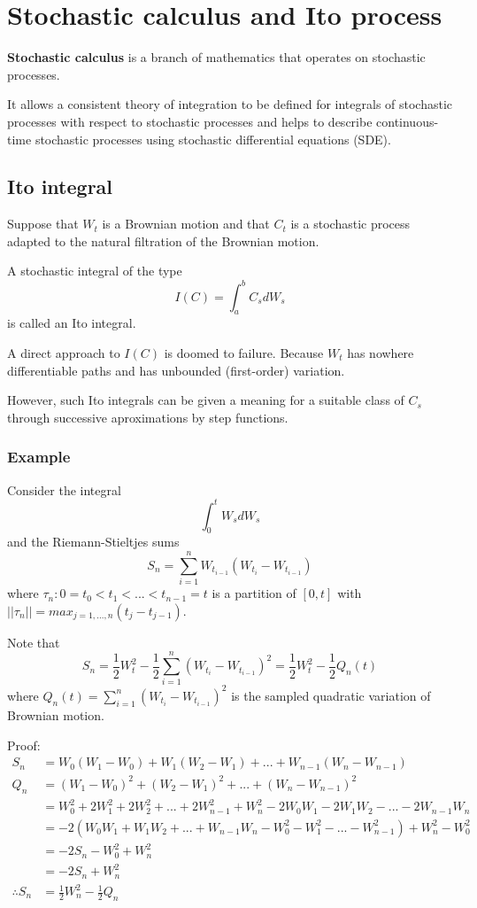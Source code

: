 \documentclass[11pt,a4paper]{book}
\theoremstyle{definition}\newtheorem{definition}{Definition}
\theoremstyle{definition}\newtheorem{fact}{Fact}
\theoremstyle{definition}\newtheorem{remark}{Remark}
\theoremstyle{definition}\newtheorem{ex}{Ex.}
\theoremstyle{definition}\newtheorem{project}{Project}
\theoremstyle{definition}\newtheorem{problem}{Problem}
\theoremstyle{definition}\newtheorem{example}{Example}
\numberwithin{theorem}{section}
\numberwithin{corollary}{chapter}
\numberwithin{assumption}{chapter}
\numberwithin{definition}{chapter}
\numberwithin{prop}{chapter}
\numberwithin{notation}{chapter}
\numberwithin{problem}{chapter}
\numberwithin{example}{chapter}
\numberwithin{fact}{chapter}
\numberwithin{ex}{chapter}
\begin{document}
\chapter{Stochastic calculus and Ito process}

\textbf{Stochastic calculus} is a branch of mathematics that operates on stochastic processes.

It allows a consistent theory of integration to be defined for integrals of stochastic processes with respect to stochastic processes and helps to describe continuous-time stochastic processes using stochastic differential equations (SDE).

\section{Ito integral}

Suppose that $W_t$ is a Brownian motion and that $C_t$ is a stochastic process adapted to the natural filtration of the Brownian motion.

A stochastic integral of the type
$$I(C) = \int_a^b C_s dW_s $$
is called an Ito integral.

A direct approach to $I(C)$ is doomed to failure. Because $W_t$ has nowhere differentiable paths and has unbounded (first-order) variation.


However, such Ito integrals can be given a meaning for a suitable class of $C_s$ through successive aproximations by step functions.

\subsection{Example}

Consider the integral
\begin{equation}
\int_0^t W_s dW_s
\end{equation}
and the Riemann-Stieltjes sums
$$ S_n = \sum_{i=1}^n W_{t_{i-1}} (W_{t_i} - W_{t_{i-1}}) $$
where $\tau_n:0 = t_0 < t_1 < ... < t_{n-1} = t$ is a partition of $[0,t]$ with $||\tau_n || = max_{j=1,...,n}(t_j - t_{j-1})$.

Note that
$$ S_n = \frac{1}{2}W_t^2 - \frac{1}{2}\sum_{i=1}^n (W_{t_i} - W_{t_{i-1}})^2 = \frac{1}{2}W_t^2 - \frac{1}{2}Q_n(t) $$
where $Q_n(t) = \sum_{i=1}^n (W_{t_i} - W_{t_{i-1}})^2$ is the sampled quadratic variation of Brownian motion.

\vspace{4pt}
Proof:
\begin{align*}
S_n &= W_0(W_1- W_0) + W_1 (W_2 - W_1) + ... + W_{n-1} (W_n - W_{n-1}) \\
Q_n &= (W_1 - W_0)^2 + (W_2-W_1)^2 + ... + (W_n - W_{n-1})^2 \\
&= W_0^2 + 2W_1^2 + 2W_2^2 + ... + 2W_{n-1}^2 + W_n^2 - 2W_0W_1 - 2W_1W_2 - ... - 2W_{n-1}W_n \\
&= -2(W_0W_1 + W_1W_2 + ... + W_{n-1}W_n - W_0^2 - W_1^2 - ... - W_{n-1}^2) + W_n^2 - W_0^2 \\
&= -2S_n - W_0^2 + W_n^2 \\
&= -2S_n + W_n^2 \\
\therefore S_n &= \frac{1}{2}W_n^2 - \frac{1}{2}Q_n
\end{align*}
\end{document}
